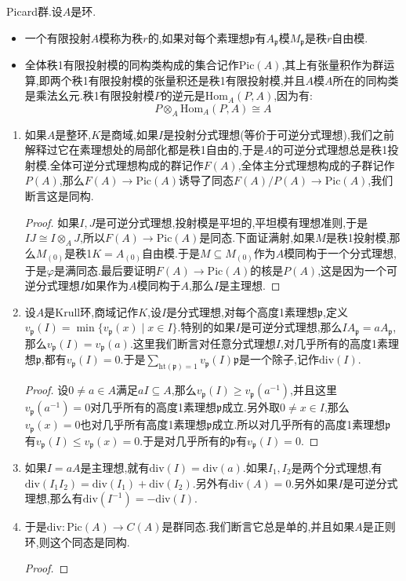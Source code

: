 Picard群.设$A$是环.
\begin{itemize}
	\item 一个有限投射$A$模称为秩$r$的,如果对每个素理想$\mathfrak{p}$有$A_{\mathfrak{p}}$模$M_{\mathfrak{p}}$是秩$r$自由模.
	\item 全体秩1有限投射模的同构类构成的集合记作$\mathrm{Pic}(A)$,其上有张量积作为群运算,即两个秩1有限投射模的张量积还是秩1有限投射模,并且$A$模$A$所在的同构类是乘法幺元.秩1有限投射模$P$的逆元是$\mathrm{Hom}_A(P,A)$,因为有:
	$$P\otimes_A\mathrm{Hom}_A(P,A)\cong A$$
\end{itemize}
\begin{enumerate}
	\item 如果$A$是整环,$K$是商域,如果$I$是投射分式理想(等价于可逆分式理想),我们之前解释过它在素理想处的局部化都是秩1自由的,于是$A$的可逆分式理想总是秩1投射模.全体可逆分式理想构成的群记作$F(A)$,全体主分式理想构成的子群记作$P(A)$,那么$F(A)\to\mathrm{Pic}(A)$诱导了同态$F(A)/P(A)\to\mathrm{Pic}(A)$,我们断言这是同构.
	\begin{proof}
		
		如果$I,J$是可逆分式理想,投射模是平坦的,平坦模有理想准则,于是$IJ\cong I\otimes_AJ$,所以$F(A)\to\mathrm{Pic}(A)$是同态.下面证满射,如果$M$是秩1投射模,那么$M_{(0)}$是秩1$K=A_{(0)}$自由模.于是$M\subseteq M_{(0)}$作为$A$模同构于一个分式理想,于是$\varphi$是满同态.最后要证明$F(A)\to\mathrm{Pic}(A)$的核是$P(A)$,这是因为一个可逆分式理想$I$如果作为$A$模同构于$A$,那么$I$是主理想.
	\end{proof}
    \item 设$A$是Krull环,商域记作$K$,设$I$是分式理想,对每个高度1素理想$\mathfrak{p}$,定义$v_{\mathfrak{p}}(I)=\min\{v_{\mathfrak{p}}(x)\mid x\in I\}$.特别的如果$I$是可逆分式理想,那么$IA_{\mathfrak{p}}=aA_{\mathfrak{p}}$,那么$v_{\mathfrak{p}}(I)=v_{\mathfrak{p}}(a)$.这里我们断言对任意分式理想$I$,对几乎所有的高度1素理想$\mathfrak{p}$,都有$v_{\mathfrak{p}}(I)=0$.于是$\sum_{\mathrm{ht}(\mathfrak{p})=1}v_{\mathfrak{p}}(I)\mathfrak{p}$是一个除子,记作$\mathrm{div}(I)$.
    \begin{proof}
    	
    	设$0\not=a\in A$满足$aI\subseteq A$,那么$v_{\mathfrak{p}}(I)\ge v_{\mathfrak{p}}(a^{-1})$,并且这里$v_{\mathfrak{p}}(a^{-1})=0$对几乎所有的高度1素理想$\mathfrak{p}$成立.另外取$0\not=x\in I$,那么$v_{\mathfrak{p}}(x)=0$也对几乎所有高度1素理想$\mathfrak{p}$成立.所以对几乎所有的高度1素理想$\mathfrak{p}$有$v_{\mathfrak{p}}(I)\le v_{\mathfrak{p}}(x)=0$.于是对几乎所有的$\mathfrak{p}$有$v_{\mathfrak{p}}(I)=0$.
    \end{proof}
    \item 如果$I=aA$是主理想,就有$\mathrm{div}(I)=\mathrm{div}(a)$.如果$I_1,I_2$是两个分式理想,有$\mathrm{div}(I_1I_2)=\mathrm{div}(I_1)+\mathrm{div}(I_2)$.另外有$\mathrm{div}(A)=0$.另外如果$I$是可逆分式理想,那么有$\mathrm{div}(I^{-1})=-\mathrm{div}(I)$.
    \item 于是$\mathrm{div}:\mathrm{Pic}(A)\to C(A)$是群同态.我们断言它总是单的,并且如果$A$是正则环,则这个同态是同构.
    \begin{proof}
    	

\end{proof}
\end{enumerate}
